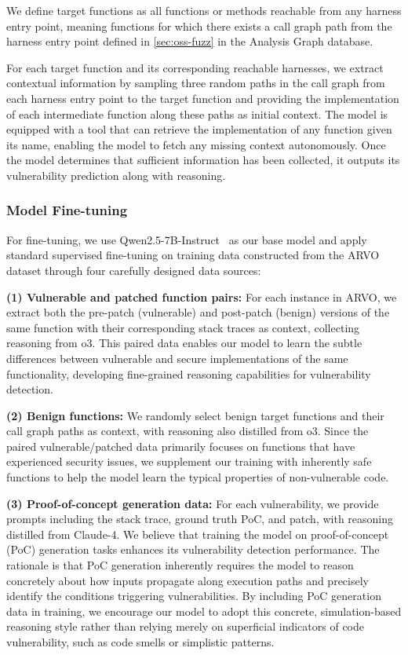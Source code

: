 We define target functions as all functions or methods reachable from any harness entry point, meaning functions for which there exists a call graph path from the harness entry point defined in \ref{sec:oss-fuzz} in the Analysis Graph database.

For each target function and its corresponding reachable harnesses, we extract contextual information by sampling three random paths in the call graph from each harness entry point to the target function and providing the implementation of each intermediate function along these paths as initial context.
The model is equipped with a tool that can retrieve the implementation of any function given its name, enabling the model to fetch any missing context autonomously.
Once the model determines that sufficient information has been collected, it outputs its vulnerability prediction along with reasoning.

\subsubsection{Model Fine-tuning}

For fine-tuning, we use Qwen2.5-7B-Instruct~\cite{yang2024qwen2} as our base model and apply standard supervised fine-tuning on training data constructed from the ARVO~\cite{mei2024arvo} dataset through four carefully designed data sources:

\textbf{(1) Vulnerable and patched function pairs:} For each instance in ARVO, we extract both the pre-patch (vulnerable) and post-patch (benign) versions of the same function with their corresponding stack traces as context, collecting reasoning from o3. This paired data enables our model to learn the subtle differences between vulnerable and secure implementations of the same functionality, developing fine-grained reasoning capabilities for vulnerability detection.

\textbf{(2) Benign functions:} We randomly select benign target functions and their call graph paths as context, with reasoning also distilled from o3. Since the paired vulnerable/patched data primarily focuses on functions that have experienced security issues, we supplement our training with inherently safe functions to help the model learn the typical properties of non-vulnerable code.

\textbf{(3) Proof-of-concept generation data:} For each vulnerability, we provide prompts including the stack trace, ground truth PoC, and patch, with reasoning distilled from Claude-4. We believe that training the model on proof-of-concept (PoC) generation tasks enhances its vulnerability detection performance. The rationale is that PoC generation inherently requires the model to reason concretely about how inputs propagate along execution paths and precisely identify the conditions triggering vulnerabilities. By including PoC generation data in training, we encourage our model to adopt this concrete, simulation-based reasoning style rather than relying merely on superficial indicators of code vulnerability, such as code smells or simplistic patterns.

